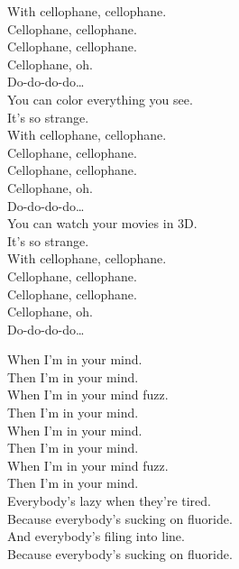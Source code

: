 With cellophane, cellophane. \\
Cellophane, cellophane. \\
Cellophane, cellophane. \\
Cellophane, oh. \\
Do-do-do-do… \\

You can color everything you see. \\
It's so strange. \\

With cellophane, cellophane. \\
Cellophane, cellophane. \\
Cellophane, cellophane. \\
Cellophane, oh. \\
Do-do-do-do… \\

You can watch your movies in 3D. \\
It's so strange. \\

With cellophane, cellophane. \\
Cellophane, cellophane. \\
Cellophane, cellophane. \\
Cellophane, oh. \\
Do-do-do-do… \\





When I'm in your mind. \\
Then I'm in your mind. \\
When I'm in your mind fuzz. \\
Then I'm in your mind. \\

When I'm in your mind. \\
Then I'm in your mind. \\
When I'm in your mind fuzz. \\
Then I'm in your mind. \\

Everybody's lazy when they're tired. \\
Because everybody's sucking on fluoride. \\
And everybody's filing into line. \\
Because everybody's sucking on fluoride. \\

